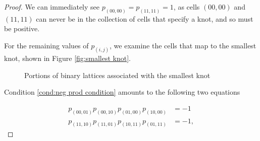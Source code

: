 \documentclass[12pt]{article}
\theoremstyle{plain}
\theoremstyle{definition}
\theoremstyle{remark}
\theoremstyle{definition}
\newcommand{\cell}[4]{ \draw[thick] ( #1 , #2 ) rectangle ( #3 , #4 );}
\newcommand{\lablnode}[3]{\node[shape=circle,draw=none,fill=none, inner sep=0pt,minimum size=0pt] (A) at ( #1 , #2 ) {#3};}
\newcommand{\lablvertex}[3]{\node[shape=circle,draw=none,fill=white, inner sep=2pt,minimum size=5pt] (A) at ( #1 , #2 ) {#3};}
\begin{document}
\begin{proof}

We can immediately see $p_{(00,00)} = p_{(11,11)} = 1$, as cells $(00,00)$ and $(11,11)$ can never be in the collection of cells that specify a knot, and so must be positive.

For the remaining values of $p_{(i,j)}$, we examine the cells that map to the smallest knot, shown in Figure \ref{fig:smallest knot}. 

\begin{figure}[h!]
\begin{center}
\end{center}
\caption{Portions of binary lattices associated with the smallest knot}
\label{fig:constraints i and ii}
\end{figure}

Condition \ref{cond:neg prod condition} amounts to the following two equations

\begin{equation}
  \begin{aligned}
  p_{(00,01)} p_{(00,10)} p_{(01,00)} p_{(10,00)} & = -1  \\
  p_{(11,10)} p_{(11,01)} p_{(10,11)} p_{(01,11)} & = -1,
  \end{aligned}
  \label{eq:constraints i and ii}
\end{equation}


\end{proof}
\end{document}
